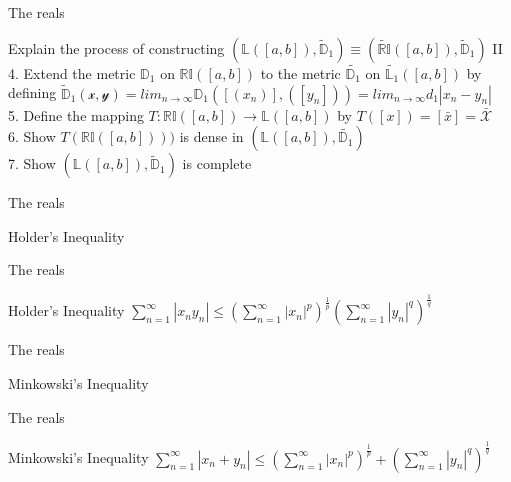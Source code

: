 \documentclass{beamer}
\begin{document}
\begin{frame}{The reals}
        \begin{block}{Explain the process of constructing $(\mathbb{L}([a,b]),\widetilde{\mathbb{D}}_1) \equiv (\widetilde{\mathbb{RI}}([a,b]),\widetilde{\mathbb{D}}_1)$ II}
		4. Extend the metric $\mathbb{D}_1$ on $\mathbb{RI}([a,b])$ to the metric $\widetilde{\mathbb{D}_1}$ on $\widetilde{\mathbb{L}_1}([a,b])$ by defining $\widetilde{\mathbb{D}}_1(\mathscr{x},\mathscr{y}) = lim_{n \rightarrow \infty} \mathbb{D}_1([(x_n)],([y_n])) = lim_{n \rightarrow \infty} d_1|x_n - y_n|$\\
		5. Define the mapping $T: \mathbb{RI}([a,b]) \rightarrow \mathbb{L}([a,b])$ by $T([x]) = [\bar{x}] = \bar{\mathscr{X}}$\\
		6. Show $T(\mathbb{RI}([a,b])))$ is dense in $(\mathbb{L}([a,b]),\widetilde{\mathbb{D}_1})$\\
		7. Show $(\mathbb{L}([a,b]),\widetilde{\mathbb{D}}_1)$ is complete
        \end{block}
\end{frame}

\begin{frame}{The reals}
	\begin{block}{Holder's Inequality}
        \end{block}
\end{frame}


\begin{frame}{The reals}
        \begin{block}{Holder's Inequality}
		$\sum_{n=1}^\infty |x_ny_n| \leq (\sum_{n=1}^\infty|x_n|^p)^\frac{1}{p}(\sum_{n=1}^\infty|y_n|^q)^\frac{1}{q}$
        \end{block}
\end{frame}

\begin{frame}{The reals}
        \begin{block}{Minkowski's Inequality}
        \end{block}
\end{frame}


\begin{frame}{The reals}
        \begin{block}{Minkowski's Inequality}
                $\sum_{n=1}^\infty |x_n + y_n| \leq (\sum_{n=1}^\infty|x_n|^p)^\frac{1}{p} + (\sum_{n=1}^\infty|y_n|^q)^\frac{1}{q}$
        \end{block}
\end{frame}
\end{document}

